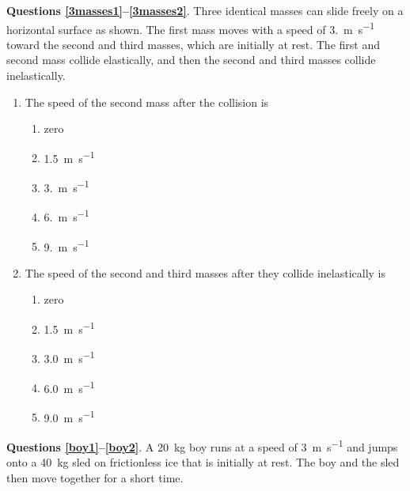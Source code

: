 \documentclass{../../../oss-apphys}
\begin{document}
\begin{multicols}{2}
  \textbf{Questions \ref{3masses1}--\ref{3masses2}}. Three identical masses can
  slide freely on a horizontal surface as shown. The first mass moves with a
  speed of \SI{3.}{\metre\per\second} toward the second and third masses, which
  are initially at rest. The first and second mass collide elastically, and
  then the second and third masses collide inelastically.
  \begin{center}
  \end{center}
  \begin{enumerate}[leftmargin=18pt,resume]
  \item The speed of the second mass after the collision is
    \label{3masses1}
    \begin{enumerate}[nosep,leftmargin=18pt,label=(\Alph*)]
    \item zero
    \item\SI{1.5}{\metre\per\second}
    \item\SI{3.}{\metre\per\second}
    \item\SI{6.}{\metre\per\second}
    \item\SI{9.}{\metre\per\second}
    \end{enumerate}

  \item The speed of the second and third masses after they collide
    inelastically is
    \label{3masses2}
    \begin{enumerate}[nosep,leftmargin=18pt,label=(\Alph*)]
    \item zero
    \item\SI{1.5}{\metre\per\second}
    \item\SI{3.0}{\metre\per\second}
    \item\SI{6.0}{\metre\per\second}
    \item\SI{9.0}{\metre\per\second}
    \end{enumerate}
  \end{enumerate}

  \textbf{Questions \ref{boy1}--\ref{boy2}}. A \SI{20}{\kilo\gram} boy runs at
  a speed of \SI{3}{\metre\per\second} and jumps onto a \SI{40}{\kilo\gram}
  sled on frictionless ice that is initially at rest. The boy and the sled then
  move together for a short time.


\end{multicols}
\end{document}
